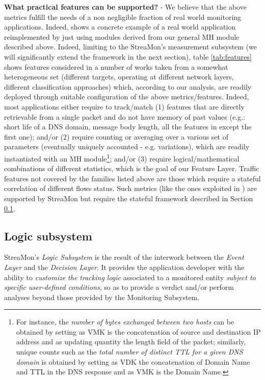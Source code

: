 \documentclass[conference,letterpaper]{sig-alternate-10pt}
\begin{document}
\textbf{What practical features can be supported?} - We believe that the above metrics fulfill the needs of a non negligible fraction of real world monitoring applications. Indeed, \cite{ccr11Bianchi} shows a concrete example of a real world application reimplemented by just using modules derived from our general MH module described above. Indeed, limiting to the StreaMon's measurement subsystem (we will significantly extend the framework in the next section), table \ref{tab:features} shows features considered in a number of works taken from a somewhat heterogeneous set (different targets, operating at different network layers, different classification approaches) which, according to our analysis, are readily deployed through suitable configuration of the above metrics/features. Indeed, most applications either require to track/match (1) features that are directly retrievable from a single packet and do not have memory of past values (e.g.: short life of a DNS domain, message body length, all the features in \cite{fastflux} except the first one); and/or (2) require counting or averaging over a various set of parameters (eventually uniquely accounted - e.g. variations), which are readily instantiated with an MH module\footnote{
	For instance, the {\em number of bytes exchanged between two hosts} can be obtained by 
	setting as VMK is the concatenation of source and destination IP address and as updating 
	quantity the length field of the packet; similarly, unique counts such as the 
	\emph{total number of distinct TTL for a given DNS domain} is obtained by setting as VDK the concatenation 
	of Domain Name and TTL in the DNS response and as VMK is the Domain Name.};
and/or (3) require logical/mathematical combinations of different statistics, which is the goal of our Feature Layer.  Traffic features not covered by the families listed above are those which require a stateful correlation of different flows status. Such metrics (like the ones exploited in \cite{scidive}) are supported by StreaMon but require the stateful framework described in Section \ref{s:tracking}.




\subsection{Logic subsystem}
\label{s:tracking}
StreaMon's \emph{Logic Subsystem} is the result of the interwork between the {\em Event Layer} and the {\em Decision Layer}. It provides the application developer with the ability to \emph{customize the tracking logic} associated to a monitored entity {\em subject to specific user-defined conditions}, so as to provide a verdict and/or perform analyses beyond those provided by the Monitoring Subsystem. 
\end{document}
